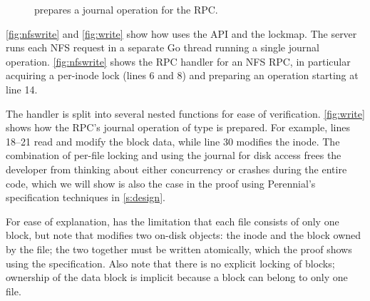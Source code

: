 %   

%  

\begin{figure}
  
  \vspace{-\baselineskip}
  \caption{ prepares a journal operation  for the 
    RPC.}
  \label{fig:write}
\end{figure}

\autoref{fig:nfswrite} and \autoref{fig:write} show how \simplenfs
uses the \txn API and the lockmap.  The server runs each NFS request in a
separate Go thread running a single journal operation. \autoref{fig:nfswrite}
shows the RPC handler for an NFS  RPC, in particular acquiring a
per-inode lock (lines 6 and 8) and preparing an operation starting at line 14.

The handler is split into several nested functions for ease of verification.
\autoref{fig:write} shows how the  RPC's journal operation of type
 is prepared. For example, lines 18--21 read and modify the block data,
while line 30 modifies the inode. The combination of per-file locking
and using the journal for disk access frees
the developer from thinking about either concurrency or crashes during the
entire  code, which we will show is also the case in the proof using Perennial's
specification techniques in \autoref{s:design}.

For ease of explanation, \simplenfs has the limitation that
each file consists of only one block, but note that 
modifies two on-disk objects: the inode and the block owned by
the file; the two together must be written atomically, which the proof shows
using the \txn specification.  Also note that there is no explicit
locking of blocks; ownership of the data block is implicit because a block can belong
to only one file.

